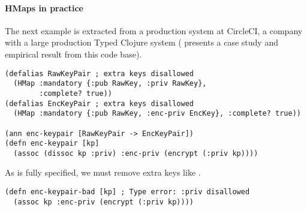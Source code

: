 \paragraph{HMaps in practice} The next example is extracted from a production system at CircleCI,
a company with a large production Typed Clojure system
( presents a case study and empirical
result from this code base).

\begin{exmp}
\begin{verbatim}
(defalias RawKeyPair ; extra keys disallowed
  (HMap :mandatory {:pub RawKey, :priv RawKey}, 
        :complete? true))
(defalias EncKeyPair ; extra keys disallowed
  (HMap :mandatory {:pub RawKey, :enc-priv EncKey}, :complete? true))

(ann enc-keypair [RawKeyPair -> EncKeyPair])
(defn enc-keypair [kp]
  (assoc (dissoc kp :priv) :enc-priv (encrypt (:priv kp))))
\end{verbatim}
\label{example:circleci}
\end{exmp}


As  is fully specified, we must remove extra keys like .
%
\begin{verbatim}
(defn enc-keypair-bad [kp] ; Type error: :priv disallowed
  (assoc kp :enc-priv (encrypt (:priv kp))))
\end{verbatim}


